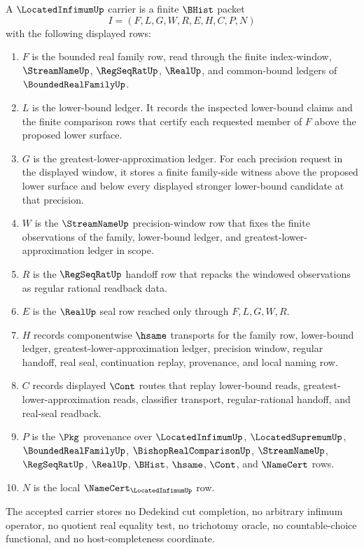 \begin{definition}
\label{def:located-infimum-carrier}
A $\LocatedInfimumUp$ carrier is a finite $\BHist$ packet
$$
I=(F,L,G,W,R,E,H,C,P,N)
$$
with the following displayed rows:
\begin{enumerate}
\item $F$ is the bounded real family row, read through the finite index-window, $\StreamNameUp$, $\RegSeqRatUp$, $\RealUp$, and common-bound ledgers of $\BoundedRealFamilyUp$.
\item $L$ is the lower-bound ledger. It records the inspected lower-bound claims and the finite comparison rows that certify each requested member of $F$ above the proposed lower surface.
\item $G$ is the greatest-lower-approximation ledger. For each precision request in the displayed window, it stores a finite family-side witness above the proposed lower surface and below every displayed stronger lower-bound candidate at that precision.
\item $W$ is the $\StreamNameUp$ precision-window row that fixes the finite observations of the family, lower-bound ledger, and greatest-lower-approximation ledger in scope.
\item $R$ is the $\RegSeqRatUp$ handoff row that repacks the windowed observations as regular rational readback data.
\item $E$ is the $\RealUp$ seal row reached only through $F,L,G,W,R$.
\item $H$ records componentwise $\hsame$ transports for the family row, lower-bound ledger, greatest-lower-approximation ledger, precision window, regular handoff, real seal, continuation replay, provenance, and local naming row.
\item $C$ records displayed $\Cont$ routes that replay lower-bound reads, greatest-lower-approximation reads, classifier transport, regular-rational handoff, and real-seal readback.
\item $P$ is the $\Pkg$ provenance over $\LocatedInfimumUp$, $\LocatedSupremumUp$, $\BoundedRealFamilyUp$, $\BishopRealComparisonUp$, $\StreamNameUp$, $\RegSeqRatUp$, $\RealUp$, $\BHist$, $\hsame$, $\Cont$, and $\NameCert$ rows.
\item $N$ is the local $\NameCert_{\LocatedInfimumUp}$ row.
\end{enumerate}
The accepted carrier stores no Dedekind cut completion, no arbitrary infimum operator, no quotient real equality test, no trichotomy oracle, no countable-choice functional, and no host-completeness coordinate.
\end{definition}

